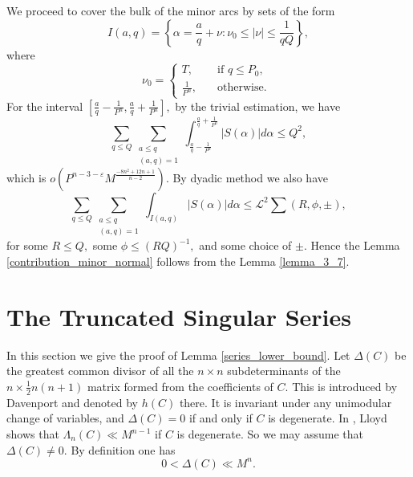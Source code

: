 \documentclass[12pt]{amsart}
\theoremstyle{definition}
\numberwithin{equation}{section}
\begin{document}
We proceed to cover the bulk of the minor arcs by sets of the form
\begin{equation*}
    I(a,q)=\left\{\alpha=\frac{a}{q}+\nu: \nu_0 \leq |\nu| \leq \frac{1}{qQ} \right\},
\end{equation*}
where 
\begin{equation*}
    \nu_0=
    \begin{cases}
        T,\quad &\text{if }q \leq P_0,\\
        \frac{1}{P^n},\quad &\text{otherwise. }
    \end{cases}
\end{equation*}
For the interval $[\frac{a}{q}-\frac{1}{P^n}, \frac{a}{q}+\frac{1}{P^n}],$ by the trivial estimation, we have
\begin{equation*}
    \sum_{q \leq Q}\sum_{\substack{a \leq q\\[3pt](a,q)=1}}\int_{\frac{a}{q}-\frac{1}{P^n}}^{\frac{a}{q}+\frac{1}{P^n}}|S(\alpha)| d\alpha \leq Q^2,
\end{equation*}
which is $o(P^{n-3-\varepsilon}M^{\frac{-8n^2+12n+1}{n-2}}).$
By dyadic method we also have
\begin{equation*}
    \sum_{q \leq Q}\sum_{\substack{a \leq q\\[3pt](a,q)=1}}\int_{I(a,q)}|S(\alpha)| d\alpha \leq \mathcal{L}^2\sum(R,\phi,\pm),
\end{equation*}
for some $R\leq Q,$ some $\phi \leq (RQ)^{-1},$ and some choice of $\pm.$ Hence the Lemma \ref{contribution_minor_normal} follows from the Lemma \ref{lemma_3_7}.


\section{The Truncated Singular Series}

In this section we give the proof of Lemma \ref{series_lower_bound}. Let $\Delta(C)$ be the greatest common divisor of all the $n \times n$ subdeterminants of the $n \times \frac{1}{2}n(n+1)$ matrix formed from the coefficients of $C.$ This is introduced by Davenport \cite{davenport2005analytic} and denoted by $h(C)$ there. It is invariant under any unimodular change of variables, and $\Delta(C)=0$ if and only if $C$ is degenerate. In \cite{lloyd1975bounds}, Lloyd shows that $\Lambda_n(C) \ll M^{n-1}$ if $C$ is degenerate. So we may assume that $\Delta(C)\neq 0.$ By definition one has 
\begin{equation*}
    0 < \Delta(C) \ll M^n.
\end{equation*}
\end{document}
